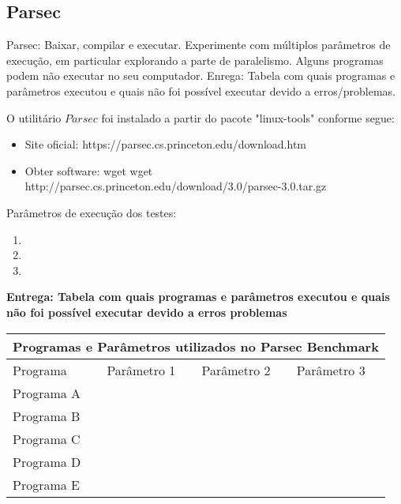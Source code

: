 
\subsection{Parsec}

Parsec: Baixar, compilar e executar. Experimente com múltiplos parâmetros de execução, em particular explorando a parte de paralelismo. Alguns programas podem não executar no seu computador. Enrega: Tabela com quais programas e parâmetros executou e quais não foi possível executar devido a erros/problemas.

O utilitário $Parsec$  foi instalado a partir do pacote "linux-tools" conforme segue:

\begin{itemize}
    \item Site oficial: https://parsec.cs.princeton.edu/download.htm
    \item Obter software: wget wget http://parsec.cs.princeton.edu/download/3.0/parsec-3.0.tar.gz
\end{itemize}


Parâmetros de execução dos testes:

\begin{enumerate}
    \item 
    \item 
    \item 
\end{enumerate}


\textbf{Entrega: Tabela com quais programas e parâmetros executou e quais não foi possível executar devido a erros problemas} \\

\begin{tabular}{ |p{3cm}||p{3cm}|p{3cm}|p{3cm}|  }
    \hline
    \multicolumn{4}{|c|}{Programas e Parâmetros utilizados no Parsec Benchmark} \\
    \hline
    Programa & Parâmetro 1 &  Parâmetro 2 &  Parâmetro 3  \\
    \hline
    Programa A & & & \\
    Programa B & & & \\
    Programa C & & & \\
    Programa D & & & \\
    Programa E & & & \\
    \hline
\end{tabular}
